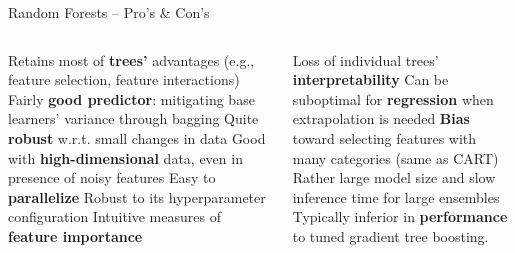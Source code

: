 \begin{frame}{Random Forests -- Pro's \& Con's}

\begin{columns}[onlytextwidth]
  \begin{column}{0.5\textwidth}
    \footnotesize
    \begin{itemize}
      \positem Retains most of \textbf{trees'} advantages (e.g., feature selection, feature interactions)
      \positem Fairly \textbf{good predictor}: mitigating base learners' variance through bagging
      \positem Quite \textbf{robust} w.r.t. small changes in data
      \positem Good with \textbf{high-dimensional} data, even in presence of noisy features
      \positem Easy to \textbf{parallelize}
      \positem Robust to its hyperparameter configuration
      \positem Intuitive measures of \textbf{feature importance}
    \end{itemize}
  \end{column}
  \begin{column}{0.5\textwidth}
    \footnotesize
    \begin{itemize}
      \negitem Loss of individual trees' \textbf{interpretability}
      \negitem Can be suboptimal for \textbf{regression} when extrapolation is needed
      \negitem \textbf{Bias} toward selecting features with many categories (same as CART)
      \negitem Rather large model size and slow inference time for large ensembles
      \negitem Typically inferior in \textbf{performance} to tuned gradient tree boosting.
    \end{itemize}
  \end{column}
\end{columns}

\vfill

\small


\end{frame}
